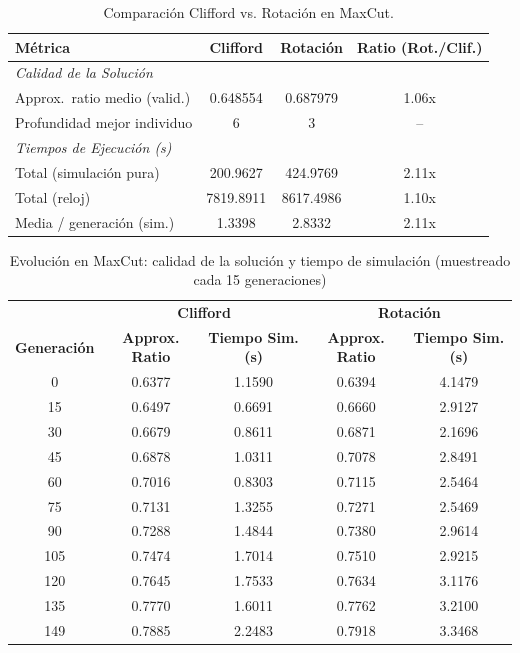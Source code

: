 \begin{table}[htbp]
\centering
\begin{tabular}{lccc}
\toprule
\textbf{Métrica} & \textbf{Clifford} & \textbf{Rotación} & \textbf{Ratio (Rot./Clif.)} \\
\midrule
\multicolumn{4}{l}{\textit{Calidad de la Solución}} \\
\midrule
Approx.\ ratio medio (valid.) & 0.648554 & 0.687979 & 1.06x \\
Profundidad mejor individuo & 6 & 3 & -- \\
\midrule
\multicolumn{4}{l}{\textit{Tiempos de Ejecución (s)}} \\
\midrule
Total (simulación pura) & 200.9627 & 424.9769 & 2.11x \\
Total (reloj) & 7819.8911 & 8617.4986 & 1.10x \\
Media / generación (sim.) & 1.3398 & 2.8332 & 2.11x \\
\bottomrule
\end{tabular}
\caption{Comparación Clifford vs. Rotación en MaxCut.}
\label{tab:comparison-maxcut}
\end{table}

\begin{table}[htbp]
\centering
\begin{tabular}{c | cc | cc}
\toprule
& \multicolumn{2}{c|}{\textbf{Clifford}} & \multicolumn{2}{c}{\textbf{Rotación}} \\
\textbf{Generación} & \textbf{Approx. Ratio} & \textbf{Tiempo Sim. (s)} & \textbf{Approx. Ratio} & \textbf{Tiempo Sim. (s)} \\
\midrule
0 & 0.6377 & 1.1590 & 0.6394 & 4.1479 \\
15 & 0.6497 & 0.6691 & 0.6660 & 2.9127 \\
30 & 0.6679 & 0.8611 & 0.6871 & 2.1696 \\
45 & 0.6878 & 1.0311 & 0.7078 & 2.8491 \\
60 & 0.7016 & 0.8303 & 0.7115 & 2.5464 \\
75 & 0.7131 & 1.3255 & 0.7271 & 2.5469 \\
90 & 0.7288 & 1.4844 & 0.7380 & 2.9614 \\
105 & 0.7474 & 1.7014 & 0.7510 & 2.9215 \\
120 & 0.7645 & 1.7533 & 0.7634 & 3.1176 \\
135 & 0.7770 & 1.6011 & 0.7762 & 3.2100 \\
149 & 0.7885 & 2.2483 & 0.7918 & 3.3468 \\
\bottomrule
\end{tabular}
\caption{Evolución en MaxCut: calidad de la solución y tiempo de simulación (muestreado cada 15 generaciones)}
\label{tab:history-maxcut}
\end{table}
